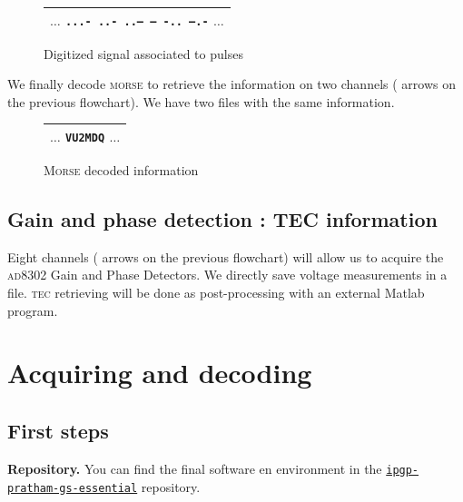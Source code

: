 \documentclass[a4paper]{report}
\begin{document}
\begin{figure}[h]
  \begin{center}
  \begin{tabular}{|c|}
    \hline
    $\dots$ \textcolor{rltred}{\texttt{...- ..- ..--- -- -.. --.-}} $\dots$\\
    \hline
  \end{tabular}
  \end{center}
  \caption{Digitized signal associated to pulses}
  \label{fig:impulsions_morse}
\end{figure}

We finally decode \textsc{morse} to retrieve the information on two channels ({ \color{rltgreen}{green} } arrows on the previous flowchart). We have two files with the same information.

\begin{figure}[h]
  \begin{center}
  \begin{tabular}{|c|}
    \hline
    $\dots$ \textcolor{rltgreen}{\texttt{VU2MDQ}} $\dots$\\
    \hline
  \end{tabular}
  \end{center}
  \caption{\textsc{Morse} decoded information}
  \label{fig:info_decode_morse}
\end{figure}


\section{Gain and phase detection : TEC information}

Eight channels ({ \color{oneblue}{blue} } arrows on the previous flowchart) will allow us to acquire the \textsc{ad8302} Gain and Phase Detectors. We directly save voltage measurements in a file. \textsc{tec} retrieving will be done as post-processing with an external Matlab program.

\chapter{Acquiring and decoding}
\label{sec:theory}

\section{First steps}

\noindent
\textbf{Repository.} You can find the final software en environment in the \href{https://github.com/EmptyStackExn/ipgp-pratham-gs-essential}{\texttt{ipgp-pratham-gs-essential}} repository.
\end{document}
